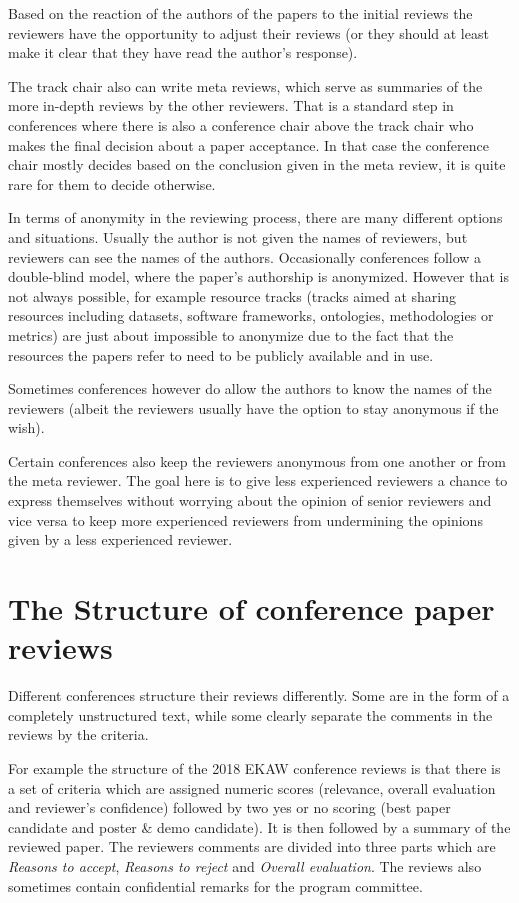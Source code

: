 Based on the reaction of the authors of the papers to the initial reviews the reviewers have the opportunity to adjust their reviews (or they should at least make it clear that they have read the author's response).

The track chair also can write meta reviews, which serve as summaries of the more in-depth reviews by the other reviewers. That is a standard step in conferences where there is also a conference chair above the track chair who makes the final decision about a paper acceptance. In that case the conference chair mostly decides based on the conclusion given in the meta review, it is quite rare for them to decide otherwise.

In terms of anonymity in the reviewing process, there are many different options and situations.  Usually the author is not given the names of reviewers, but reviewers can see the names of the authors. Occasionally conferences follow a double-blind model, where the paper's authorship is anonymized. However that is not always possible, for example resource tracks (tracks aimed at sharing resources including datasets, software frameworks, ontologies, methodologies or metrics) are just about impossible to anonymize due to the fact that the resources the papers refer to need to be publicly available and in use. 

Sometimes conferences however do allow the authors to know the names of the reviewers (albeit the reviewers usually have the option to stay anonymous if the wish).

Certain conferences also keep the reviewers anonymous from one another or from the meta reviewer. The goal here is to give less experienced reviewers a chance to express themselves without worrying about the opinion of senior reviewers and vice versa to keep more experienced reviewers from undermining the opinions given by a less experienced reviewer.
\section{The Structure of conference paper reviews}
\label{sec:rev_structure}
Different conferences structure their reviews differently. Some are in the form of a completely unstructured text, while some clearly separate the comments in the reviews by the criteria. 

For example the structure of the 2018 EKAW conference reviews is that there is a set of criteria which are assigned numeric scores (relevance, overall evaluation and reviewer's confidence) followed by two yes or no scoring (best paper candidate and poster \& demo candidate). It is then followed by a summary of the reviewed paper. The reviewers comments are divided into three parts which are \textit{Reasons to accept}, \textit{Reasons to reject} and \textit{Overall evaluation}. The reviews also sometimes contain confidential remarks for the program committee.

